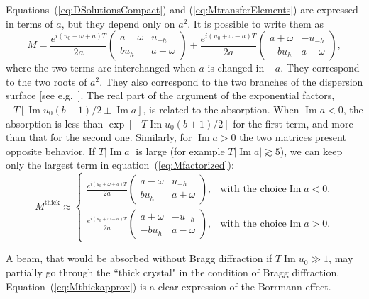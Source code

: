 \documentclass{iucr}
\begin{document}
Equations~(\ref{eq:DSolutionsCompact}) and (\ref{eq:MtransferElements}) are expressed in terms of $a$, but they depend only on $a^2$.
It is possible to write them as 
\begin{equation}\label{eq:Mfactorized}
    M =
    \frac{e^{i(u_0+\omega+a)T}}{2a}
    \begin{pmatrix}
    a-\omega & u_{-h}\\
    b u_h & a + \omega
    \end{pmatrix}
    + 
    \frac{e^{i(u_0+\omega-a)T}}{2a}
    \begin{pmatrix}
    a+\omega & -u_{-h}\\
    -b u_h & a - \omega
    \end{pmatrix}, 
\end{equation}
where the two terms are interchanged when $a$ is changed in $-a$. They correspond to the two roots of $a^2$.
They also correspond to the two branches of the dispersion surface [see e.g.~\cite{authierbook}]. 
The real part of the argument of the exponential factors, $-T [\operatorname{Im} u_0 (b+1)/2  \pm \operatorname{Im} a]$, is related to the absorption.
When $\operatorname{Im}a<0$, the absorption is less than $\exp[-T \operatorname{Im} u_0 (b+1)/2 ]$ for the first term, and more than that for the second one.
Similarly, for  $\operatorname{Im}a > 0$ the two matrices present opposite behavior.  If $T |\operatorname{Im}a|$ is large (for example $T |\operatorname{Im}a|  \gtrsim 5$), we can keep only the largest term in equation~(\ref{eq:Mfactorized}):
\begin{equation}\label{eq:Mthickapprox}
    M^{\text{thick}} \approx \begin{cases} 
    \frac{e^{i(u_0+\omega+a)T}}{2a}
    \begin{pmatrix}
    a-\omega & u_{-h}\\
    b u_h & a + \omega
    \end{pmatrix}, & \text{with the choice} \operatorname{Im}a<0.\\
    
    \frac{e^{i(u_0+\omega-a)T}}{2a}
    \begin{pmatrix}
    a+\omega & -u_{-h}\\
    -b u_h & a - \omega
    \end{pmatrix}, & \text{with the choice} \operatorname{Im}a>0.
    \end{cases}
\end{equation} 

A beam, that would be absorbed without Bragg diffraction if $T \operatorname{Im} u_0 \gg  1$, may partially go through the ``thick crystal" in the condition of Bragg diffraction. Equation~(\ref{eq:Mthickapprox}) is a clear expression of the Borrmann effect.
\end{document}
